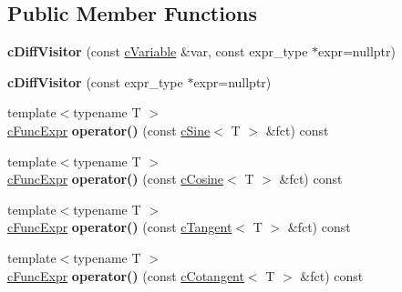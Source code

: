 \subsection*{Public Member Functions}
\begin{DoxyCompactItemize}
\item 
\hypertarget{classcDiffVisitor_a9616f571c470507f14b7d53fa264e62a}{{\bfseries c\-Diff\-Visitor} (const \hyperlink{classcVariable}{c\-Variable} \&var, const expr\-\_\-type $\ast$expr=nullptr)}\label{classcDiffVisitor_a9616f571c470507f14b7d53fa264e62a}

\item 
\hypertarget{classcDiffVisitor_a06894879dd9909864ed716f6f41a7a27}{{\bfseries c\-Diff\-Visitor} (const expr\-\_\-type $\ast$expr=nullptr)}\label{classcDiffVisitor_a06894879dd9909864ed716f6f41a7a27}

\item 
\hypertarget{classcDiffVisitor_aba4ba7b1bf7fcce8ab94b7f5af45ff1c}{{\footnotesize template$<$typename T $>$ }\\\hyperlink{classcFuncExpr}{c\-Func\-Expr} {\bfseries operator()} (const \hyperlink{classcSine}{c\-Sine}$<$ T $>$ \&fct) const }\label{classcDiffVisitor_aba4ba7b1bf7fcce8ab94b7f5af45ff1c}

\item 
\hypertarget{classcDiffVisitor_a6df5b123d46a980fe733434c830f744b}{{\footnotesize template$<$typename T $>$ }\\\hyperlink{classcFuncExpr}{c\-Func\-Expr} {\bfseries operator()} (const \hyperlink{classcCosine}{c\-Cosine}$<$ T $>$ \&fct) const }\label{classcDiffVisitor_a6df5b123d46a980fe733434c830f744b}

\item 
\hypertarget{classcDiffVisitor_abcff4dcf5b419462fc7a89262202e156}{{\footnotesize template$<$typename T $>$ }\\\hyperlink{classcFuncExpr}{c\-Func\-Expr} {\bfseries operator()} (const \hyperlink{classcTangent}{c\-Tangent}$<$ T $>$ \&fct) const }\label{classcDiffVisitor_abcff4dcf5b419462fc7a89262202e156}

\item 
\hypertarget{classcDiffVisitor_a933f65f45ea263c92e4c9b4640f670d8}{{\footnotesize template$<$typename T $>$ }\\\hyperlink{classcFuncExpr}{c\-Func\-Expr} {\bfseries operator()} (const \hyperlink{classcCotangent}{c\-Cotangent}$<$ T $>$ \&fct) const }\label{classcDiffVisitor_a933f65f45ea263c92e4c9b4640f670d8}


\end{DoxyCompactItemize}
